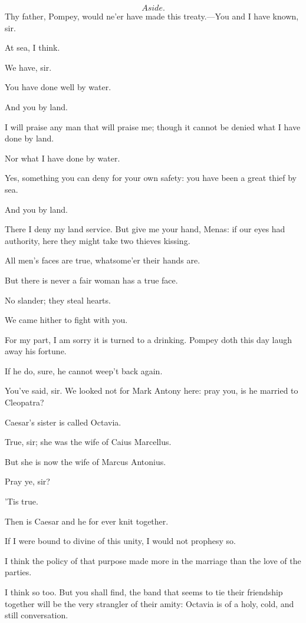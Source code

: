 \documentclass{book}
\begin{document}
\begin{PROSE}

	\[Aside.\]  Thy father, Pompey, would ne'er have
	made this treaty.---You and I have known, sir.

	At sea, I think.

	We have, sir.

	You have done well by water.

	And you by land.

	I will praise any man that will praise me; though it
	cannot be denied what I have done by land.

	Nor what I have done by water.

	Yes, something you can deny for your own
	safety: you have been a great thief by sea.

	And you by land.

	There I deny my land service. But give me your
	hand, Menas: if our eyes had authority, here they
	might take two thieves kissing.

	All men's faces are true, whatsome'er their hands are.

	But there is never a fair woman has a true face.

	No slander; they steal hearts.

	We came hither to fight with you.

	For my part, I am sorry it is turned to a drinking.
	Pompey doth this day laugh away his fortune.

	If he do, sure, he cannot weep't back again.

	You've said, sir. We looked not for Mark Antony
	here: pray you, is he married to Cleopatra?

	Caesar's sister is called Octavia.

	True, sir; she was the wife of Caius Marcellus.

	But she is now the wife of Marcus Antonius.

	Pray ye, sir?

	'Tis true.

	Then is Caesar and he for ever knit together.

	If I were bound to divine of this unity, I would
	not prophesy so.

	I think the policy of that purpose made more in the
	marriage than the love of the parties.

	I think so too. But you shall find, the band that
	seems to tie their friendship together will be the
	very strangler of their amity: Octavia is of a
	holy, cold, and still conversation.


\end{PROSE}
\end{document}

